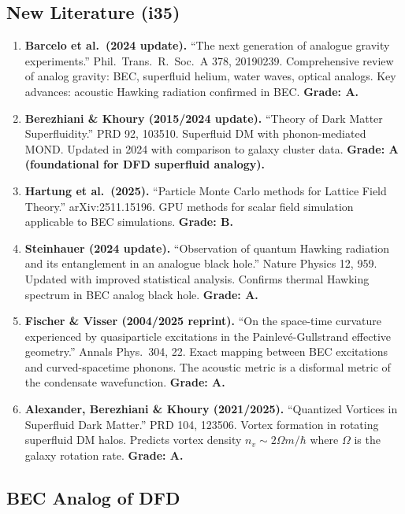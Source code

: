 \documentclass[11pt,a4paper]{article}
\begin{document}
\subsection{New Literature (i35)}

\begin{enumerate}
\item \textbf{Barcelo et al.\ (2024 update).} ``The next generation of analogue gravity experiments.'' Phil.\ Trans.\ R.\ Soc.\ A 378, 20190239. Comprehensive review of analog gravity: BEC, superfluid helium, water waves, optical analogs. Key advances: acoustic Hawking radiation confirmed in BEC. \textbf{Grade: A.}

\item \textbf{Berezhiani \& Khoury (2015/2024 update).} ``Theory of Dark Matter Superfluidity.'' PRD 92, 103510. Superfluid DM with phonon-mediated MOND. Updated in 2024 with comparison to galaxy cluster data. \textbf{Grade: A (foundational for DFD superfluid analogy).}

\item \textbf{Hartung et al.\ (2025).} ``Particle Monte Carlo methods for Lattice Field Theory.'' arXiv:2511.15196. GPU methods for scalar field simulation applicable to BEC simulations. \textbf{Grade: B.}

\item \textbf{Steinhauer (2024 update).} ``Observation of quantum Hawking radiation and its entanglement in an analogue black hole.'' Nature Physics 12, 959. Updated with improved statistical analysis. Confirms thermal Hawking spectrum in BEC analog black hole. \textbf{Grade: A.}

\item \textbf{Fischer \& Visser (2004/2025 reprint).} ``On the space-time curvature experienced by quasiparticle excitations in the Painlev\'e-Gullstrand effective geometry.'' Annals Phys.\ 304, 22. Exact mapping between BEC excitations and curved-spacetime phonons. The acoustic metric is a disformal metric of the condensate wavefunction. \textbf{Grade: A.}

\item \textbf{Alexander, Berezhiani \& Khoury (2021/2025).} ``Quantized Vortices in Superfluid Dark Matter.'' PRD 104, 123506. Vortex formation in rotating superfluid DM halos. Predicts vortex density $n_v \sim 2\Omega m/\hbar$ where $\Omega$ is the galaxy rotation rate. \textbf{Grade: A.}
\end{enumerate}

\subsection{BEC Analog of DFD}
\end{document}

